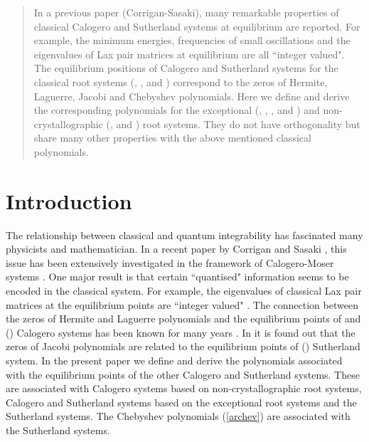 \documentclass[a4paper,12pt]{article}
\begin{document}
\begin{abstract}
In a previous paper (Corrigan-Sasaki), many remarkable properties of
classical Calogero and Sutherland systems at equilibrium are reported.
For example, the minimum energies, frequencies of small oscillations and
the eigenvalues of Lax pair matrices at equilibrium are all ``integer valued".
The equilibrium positions of Calogero and Sutherland systems for the
classical root systems (\coordHE{}, \coordHE{}, \coordHE{} and \coordHE{}) correspond to
the zeros of Hermite, Laguerre, Jacobi and Chebyshev polynomials.
Here we define and derive the corresponding polynomials for the exceptional
(\coordHE{}, \coordHE{}, \coordHE{}, \coordHE{} and \coordHE{}) and non-crystallographic (\coordHE{},
\coordHE{} and \coordHE{}) root systems. They do not have orthogonality but share
many other properties with the above mentioned classical polynomials.
\end{abstract}

\newpage
\section{Introduction}
\label{intro}
\setcounter{equation}{0}

The relationship between classical and quantum integrability
has fascinated many physicists and mathematician.
In a recent paper by Corrigan and Sasaki \cite{cs}, this issue has been
extensively investigated in the framework of Calogero-Moser systems
\cite{Cal,Sut,CalMo}. One major result is that certain
``quantised" information seems to be encoded in the classical
system. For example, the eigenvalues of classical Lax pair matrices
at the equilibrium points are ``integer valued" \cite{cs}.
The connection between the zeros of Hermite and Laguerre
polynomials and the equilibrium points of \coordHE{} and \coordHE{}
(\coordHE{}) Calogero systems has been known for many years
\cite{calmat,calpere,ahmcal}.
In \cite{cs} it is found out that the zeros of Jacobi
polynomials are related to the equilibrium points of \coordHE{}
(\coordHE{}) Sutherland system.
In the present paper we define and derive the polynomials associated
with the equilibrium points of the other Calogero and Sutherland 
systems. These are associated with Calogero systems based on
non-crystallographic root systems, Calogero and Sutherland
systems based on the exceptional root systems and the \coordHE{} Sutherland
systems. The Chebyshev polynomials (\ref{archev}) are associated with
the \coordHE{} Sutherland systems.
\end{document}
